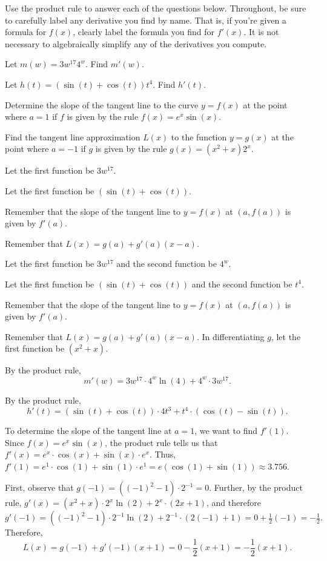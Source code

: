 \begin{activity} \label{A:2.5.1}  Use the product rule to answer each of the questions below.  Throughout, be sure to carefully label any derivative you find by name.  That is, if you're given a formula for $f(x)$, clearly label the formula you find for $f'(x)$.  It is not necessary to algebraically simplify any of the derivatives you compute.
\ba
	\item Let $m(w)=3w^{17} 4^w$.  Find $m'(w)$.
	\item Let $h(t) = (\sin(t) + \cos(t))t^4$.  Find $h'(t)$.
	\item Determine the slope of the tangent line to the curve $y = f(x)$ at the point where $a = 1$ if $f$ is given by the rule $f(x) = e^x \sin(x)$.
	\item Find the tangent line approximation $L(x)$ to the function $y = g(x)$ at the point where $a = -1$ if $g$ is given by the rule $g(x) = (x^2 + x) 2^x$.
\ea

\end{activity}
\begin{smallhint}
\ba
	\item Let the first function be $3w^{17}$.
	\item Let the first function be $(\sin(t) + \cos(t))$.
	\item Remember that the slope of the tangent line to $y = f(x)$ at $(a,f(a))$ is given by $f'(a)$.
	\item Remember that $L(x) = g(a) + g'(a)(x-a).$
\ea
\end{smallhint}
\begin{bighint}
\ba
	\item Let the first function be $3w^{17}$ and the second function be $4^w$.
	\item Let the first function be $(\sin(t) + \cos(t))$ and the second function be $t^4$.
	\item Remember that the slope of the tangent line to $y = f(x)$ at $(a,f(a))$ is given by $f'(a)$.
	\item Remember that $L(x) = g(a) + g'(a)(x-a).$  In differentiating $g$, let the first function be $(x^2 + x)$.
\ea
\end{bighint}
\begin{activitySolution}
\ba
	\item By the product rule, 
	$$m'(w) = 3w^{17} \cdot 4^w \ln(4) + 4^w \cdot 3w^17.$$ 
	\item By the product rule, 
	$$h'(t) = (\sin(t) + \cos(t)) \cdot 4t^3 + t^4 \cdot (\cos(t) - \sin(t)).$$ 
	\item To determine the slope of the tangent line at $a = 1$, we want to find $f'(1)$.  Since $f(x) = e^x \sin(x)$, the product rule tells us that $f'(x) = e^x \cdot \cos(x) + \sin(x) \cdot e^x$.  Thus, $f'(1) = e^1 \cdot \cos(1) + \sin(1) \cdot e^1 = e(\cos(1) + \sin(1)) \approx 3.756$.
	\item First, observe that $g(-1) = ((-1)^2 - 1) \cdot 2^{-1} = 0$.  Further, by the product rule, $g'(x) = (x^2 + x) \cdot 2^x \ln(2) + 2^x \cdot (2x + 1)$, and therefore $g'(-1) = ((-1)^2 - 1) \cdot 2^{-1} \ln(2) + 2^{-1} \cdot (2(-1) + 1) = 0 + \frac{1}{2}(-1) = -\frac{1}{2}.$  Therefore,
	$$L(x) = g(-1) + g'(-1)(x+1) = 0 - \frac{1}{2}(x+1) = -\frac{1}{2}(x+1).$$
\ea
\end{activitySolution}
\aftera